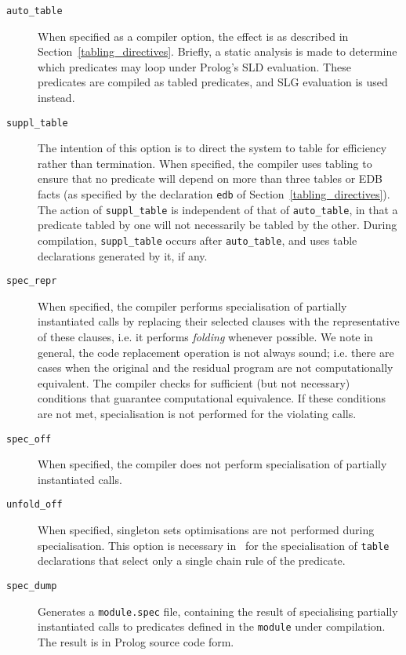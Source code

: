 \begin{description}
\item[{\tt auto\_table}]
	When specified as a compiler option, the effect is
	as described in Section~\ref{tabling_directives}.  Briefly, a static
	analysis is made to determine which predicates may loop under Prolog's
	SLD evaluation.  These predicates are compiled as tabled predicates,
	and SLG evaluation is used instead.
\item[{\tt suppl\_table}]
	The intention of this option is to direct the
	system to table for efficiency rather than termination.  When 
	specified, the compiler uses tabling to ensure that no predicate
	will depend on more than three tables or EDB facts (as specified
	by the declaration {\tt edb} of Section~\ref{tabling_directives}).
        The action of {\tt suppl\_table} is independent of that of
	{\tt auto\_table}, in that a predicate tabled by one will not
	necessarily be tabled by the other.
	During compilation, {\tt suppl\_table} occurs after {\tt auto\_table},
	and uses table declarations generated by it, if any.
\item[{\tt spec\_repr}]
	When specified, the compiler performs specialisation of partially
	instantiated calls by replacing their selected clauses with the
	representative of these clauses, i.e. it performs {\em folding\/}
	whenever possible.  We note in general, the code replacement
	operation is not always sound; i.e. there
	are cases when the original and the residual program are not
	computationally equivalent.  The compiler checks for sufficient (but
	not necessary) conditions that guarantee computational equivalence.
	If these conditions are not met, specialisation is not performed
	for the violating calls.
\item[{\tt spec\_off}]
	When specified, the compiler does not perform specialisation of
	partially instantiated calls.
\item[{\tt unfold\_off}]
	When specified, singleton sets optimisations are not performed
	during specialisation.  This option is necessary in \version\
	for the specialisation of {\tt table} declarations that select
	only a single chain rule of the predicate.
\item[{\tt spec\_dump}]
	Generates a {\tt module.spec} file, containing the result of
	specialising partially instantiated calls to predicates defined
	in the {\tt module} under compilation.  The result is in Prolog
	source code form.


\end{description}
